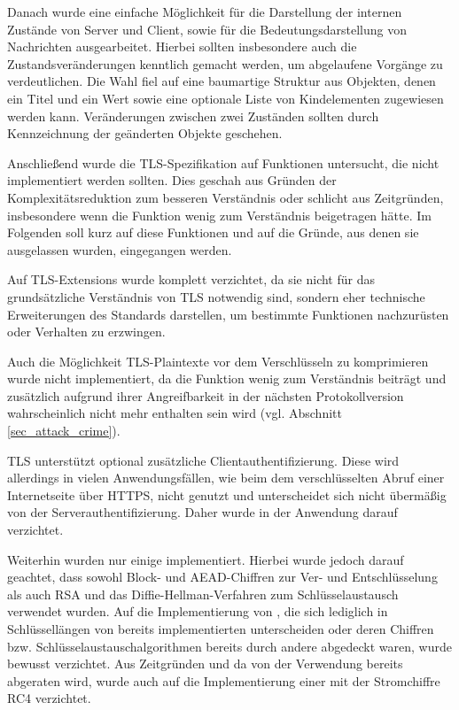Danach wurde eine einfache Möglichkeit für die Darstellung der internen Zustände von Server und Client, sowie für die Bedeutungsdarstellung von Nachrichten ausgearbeitet. Hierbei sollten insbesondere auch die Zustandsveränderungen kenntlich gemacht werden, um abgelaufene Vorgänge zu verdeutlichen. Die Wahl fiel auf eine baumartige Struktur aus Objekten, denen ein Titel und ein Wert sowie eine optionale Liste von Kindelementen zugewiesen werden kann. Veränderungen zwischen zwei Zuständen sollten durch Kennzeichnung der geänderten Objekte geschehen.


Anschließend wurde die TLS-Spezifikation auf Funktionen untersucht, die nicht implementiert werden sollten. Dies geschah aus Gründen der Komplexitätsreduktion zum besseren Verständnis oder schlicht aus Zeitgründen, insbesondere wenn die Funktion wenig zum Verständnis beigetragen hätte. Im Folgenden soll kurz auf diese Funktionen und auf die Gründe, aus denen sie ausgelassen wurden, eingegangen werden.

Auf TLS-Extensions wurde komplett verzichtet, da sie nicht für das grundsätzliche Verständnis von TLS notwendig sind, sondern eher technische Erweiterungen des Standards darstellen, um bestimmte Funktionen nachzurüsten oder Verhalten zu erzwingen.

Auch die Möglichkeit TLS-Plaintexte vor dem Verschlüsseln zu komprimieren wurde nicht implementiert, da die Funktion wenig zum Verständnis beiträgt und zusätzlich aufgrund ihrer Angreifbarkeit in der nächsten Protokollversion wahrscheinlich nicht mehr enthalten sein wird (vgl. Abschnitt \ref{sec_attack_crime}).

TLS unterstützt optional zusätzliche Clientauthentifizierung. Diese wird allerdings in vielen Anwendungsfällen, wie beim dem verschlüsselten Abruf einer Internetseite über HTTPS, nicht genutzt und unterscheidet sich nicht übermäßig von der Serverauthentifizierung. Daher wurde in der Anwendung darauf verzichtet.

Weiterhin wurden nur einige \ciphersuites{} implementiert. Hierbei wurde jedoch darauf geachtet, dass sowohl Block- und AEAD-Chiffren zur Ver- und Entschlüsselung als auch RSA und das Diffie-Hellman-Verfahren zum Schlüsselaustausch verwendet wurden. Auf die Implementierung von \ciphersuites{}, die sich lediglich in Schlüssellängen von bereits implementierten \ciphersuites{} unterscheiden oder deren Chiffren bzw. Schlüsselaustauschalgorithmen bereits durch andere \ciphersuites{} abgedeckt waren, wurde bewusst verzichtet. Aus Zeitgründen und da von der Verwendung bereits abgeraten wird, wurde auch auf die Implementierung einer \ciphersuite{} mit der Stromchiffre RC4 verzichtet.

